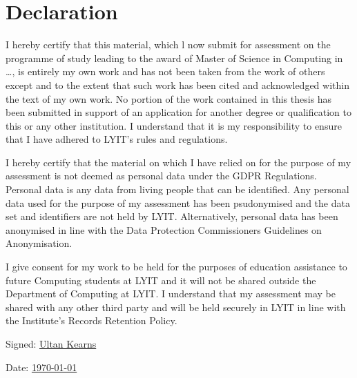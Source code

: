 \documentclass[a4paper,11pt]{report}
\begin{document}

\chapter*{Declaration}

I hereby certify that this material, which l now submit for assessment on the programme of study leading to the award of Master of Science in Computing in \dots, is entirely my own work and has not been taken from the work of others except and to the extent that such work has been cited and acknowledged within the text of my own work. No portion of the work contained in this thesis has been submitted in support of an application for another degree or qualification to this or any other institution. I understand that it is my responsibility to ensure that I have adhered to LYIT’s rules and regulations. 
\bigskip

I hereby certify that the material on which I have relied on for the purpose of my assessment is not deemed as personal data under the GDPR Regulations. Personal data is any data from living people that can be identified. Any personal data used for the purpose of my assessment has been psudonymised and the data set and identifiers are not held by LYIT. Alternatively, personal data has been anonymised in line with the Data Protection Commissioners Guidelines on Anonymisation.
\bigskip

I give consent for my work to be held for the purposes of education assistance to future Computing students at LYIT and it will not be shared outside the Department of Computing at LYIT. I understand that my assessment may be shared with any other third party and will be held securely in LYIT in line with the Institute's Records Retention Policy. 

\vspace{20pt}

\hspace{60pt} Signed: \underline{\quad \quad Ultan Kearns\hspace{240pt}} 


\bigskip

\hspace{70pt} Date: \underline{\quad \quad\today\hspace{150pt}} 





\printbibliography
\end{document}
